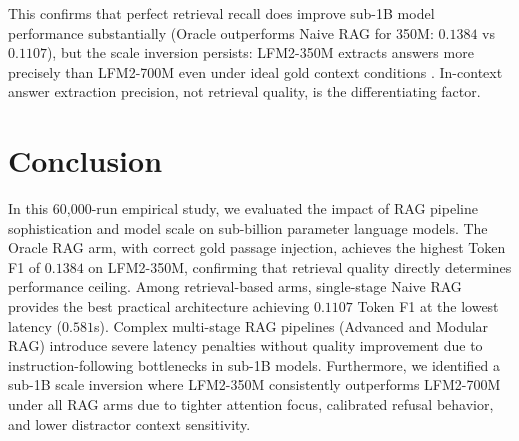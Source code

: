 \documentclass[conference]{IEEEtran}
\begin{document}
This confirms that perfect retrieval recall does improve sub-1B model performance substantially (Oracle outperforms Naive RAG for 350M: $0.1384$ vs $0.1107$), but the scale inversion persists: LFM2-350M extracts answers more precisely than LFM2-700M even under ideal gold context conditions \cite{asai2023self}. In-context answer extraction precision, not retrieval quality, is the differentiating factor.

\section{Conclusion}
\label{sec:conclusion}
In this 60,000-run empirical study, we evaluated the impact of RAG pipeline sophistication and model scale on sub-billion parameter language models. The Oracle RAG arm, with correct gold passage injection, achieves the highest Token F1 of $0.1384$ on LFM2-350M, confirming that retrieval quality directly determines performance ceiling. Among retrieval-based arms, single-stage Naive RAG provides the best practical architecture achieving $0.1107$ Token F1 at the lowest latency ($0.581$s). Complex multi-stage RAG pipelines (Advanced and Modular RAG) introduce severe latency penalties without quality improvement due to instruction-following bottlenecks in sub-1B models. Furthermore, we identified a sub-1B scale inversion where LFM2-350M consistently outperforms LFM2-700M under all RAG arms due to tighter attention focus, calibrated refusal behavior, and lower distractor context sensitivity.
\end{document}
